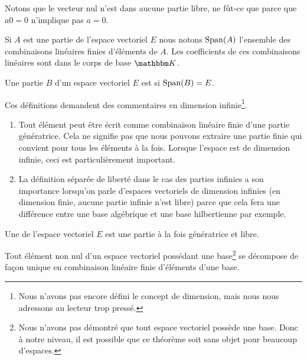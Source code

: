 \begin{remark}
    Notons que le vecteur nul n'est dans aucune partie libre, ne fût-ce que parce que \( a0=0\) n'implique pas \( a=0\).
\end{remark}

Si \( A\) est une partie de l'espace vectoriel \( E\) nous notons \( \operatorname{Span}(A)\) l'ensemble des combinaisons linéaires finies d'éléments de \( A\). Les coefficients de ces combinaisons linéaires sont dans le corps de base \( \eK\).

\begin{definition}
    Une partie $B$ d'un espace vectoriel \( E\) est  si \( \operatorname{Span}(B)=E\).
\end{definition}

\begin{remark}
    Ces définitions demandent des commentaires en dimension infinie\footnote{Nous n'avons pas encore défini le concept de dimension, mais nous nous adressons au lecteur trop pressé.}.

    \begin{enumerate}
        \item
    Tout élément peut être écrit comme combinaison linéaire finie d'une partie génératrice. Cela ne signifie pas que nous pouvons extraire une partie finie qui convient pour tous les éléments à la fois. Lorsque l'espace est de dimension infinie, ceci est particulièrement important.
\item
    La définition séparée de liberté dans le cas des parties infinies a son importance lorsqu'on parle d'espaces vectoriels de dimension infinies (en dimension finie, aucune partie infinie n'est libre) parce que cela fera une différence entre une base algébrique et une base hilbertienne par exemple.
    \end{enumerate}
\end{remark}

\begin{definition}[Base]        \label{DEFooNGDSooEDAwTh}
    Une  de l'espace vectoriel \( E\) est une partie à la fois génératrice et libre.
\end{definition}

\begin{proposition}      \label{PROPooEIQIooXfWDDV}
    Tout élément non nul d'un espace vectoriel possédant une base\footnote{Nous n'avons pas démontré que tout espace vectoriel possède une base. Donc à notre niveau, il est possible que ce théorème soit sans objet pour beaucoup d'espaces.} se décompose de façon unique en combinaison linéaire finie d'éléments d'une base.
\end{proposition}

